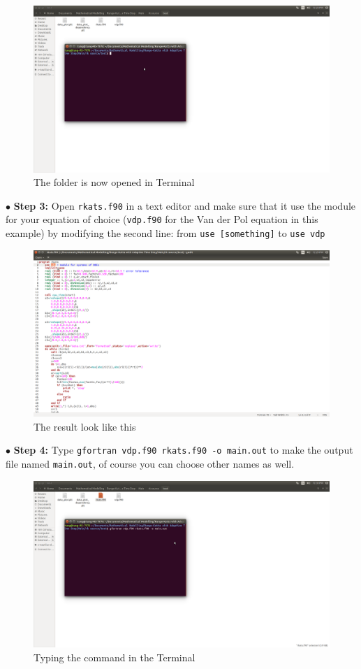 \documentclass[a4paper,oneside]{book}
\numberwithin{equation}{chapter}
\begin{document}
	\begin{figure}[H]
		\centering	\includegraphics[width=15cm]{fig3}
		\caption{The folder is now opened in Terminal}
	\end{figure}
	\noindent$\bullet$ \textbf{Step 3:} Open \texttt{rkats.f90} in a text editor and make sure that it use the module for your equation of choice (\texttt{vdp.f90} for the Van der Pol equation in this example) by modifying the second line: from \texttt{use [something]} to \texttt{use vdp}
	\begin{figure}[H]
		\centering	\includegraphics[width=15cm]{fig4}
		\caption{The result look like this}
	\end{figure}
	\noindent$\bullet$ \textbf{Step 4:} Type \texttt{gfortran vdp.f90 rkats.f90 -o main.out} to make the output file named \texttt{main.out}, of course you can choose other names as well.
	\begin{figure}[H]
		\centering	\includegraphics[width=15cm]{fig5}
		\caption{Typing the command in the Terminal}
	\end{figure}
\end{document}
